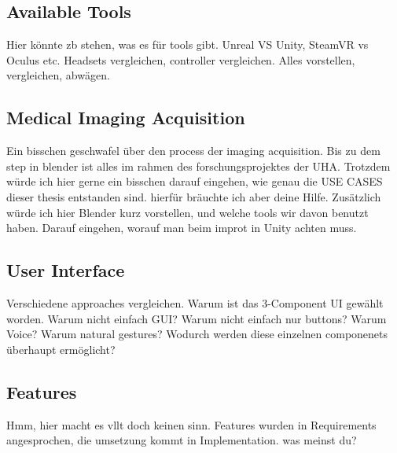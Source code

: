 \subsection{\label{sec::ApproachAvailableTools}Available Tools}

Hier könnte zb stehen, was es für tools gibt.
Unreal VS Unity, SteamVR vs Oculus etc.
Headsets vergleichen, controller vergleichen.
Alles vorstellen, vergleichen, abwägen.
%
%
\subsection{\label{sec::ApproachAcquisition}Medical Imaging Acquisition}
Ein bisschen geschwafel über den process der imaging acquisition.
Bis zu dem step in blender ist alles im rahmen des forschungsprojektes der UHA.
Trotzdem würde ich hier gerne ein bisschen darauf eingehen, wie genau die USE CASES
dieser thesis entstanden sind. hierfür bräuchte ich aber deine Hilfe.
Zusätzlich würde ich hier Blender kurz vorstellen, und welche tools wir davon benutzt haben.
Darauf eingehen, worauf man beim improt in Unity achten muss.
%
\subsection{\label{sec::ApproachUserInterface}User Interface}
Verschiedene approaches vergleichen.
Warum ist das 3-Component UI gewählt worden.
Warum nicht einfach GUI?
Warum nicht einfach nur buttons?
Warum Voice?
Warum natural gestures?
Wodurch werden diese einzelnen componenets überhaupt ermöglicht?

%
\subsection{\label{sec::ApproachFeatures}Features}
Hmm, hier macht es vllt doch keinen sinn. Features wurden in Requirements angesprochen,
die umsetzung kommt in Implementation. was meinst du?
%